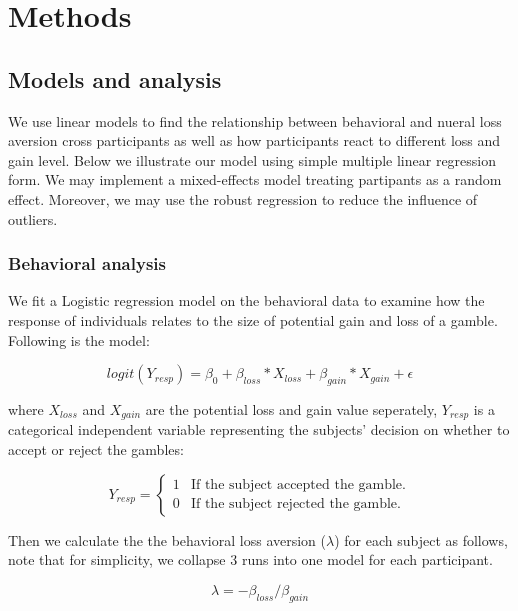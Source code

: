 \section{Methods}

\subsection{Models and analysis}

We use linear models to find the relationship between behavioral and nueral 
loss aversion cross participants as well as how participants react to different 
loss and gain level. Below we illustrate our model using simple multiple linear 
regression form. We may implement a mixed-effects model treating partipants as
a random effect. Moreover, we may use the robust regression to reduce the 
influence of outliers.

\subsubsection{Behavioral analysis}

We fit a Logistic regression model on the behavioral data to examine how the 
response of individuals relates to the size of potential gain and loss of a 
gamble. Following is the model:

\begin{equation}
logit(Y_{resp}) = \beta_0 + \beta_{loss} *X_{loss} + \beta_{gain} * X_{gain}  + 
\epsilon
\end{equation}

where $X_{loss}$ and $X_{gain}$ are the potential loss and gain value 
seperately, $Y_{resp}$ is a categorical independent variable representing 
the subjects' decision on whether to accept or reject the gambles:

\begin{displaymath}
Y_{resp} = \left \{ \begin{array}{ll}
1 & \textrm{If the subject accepted the gamble.} \\
0 & \textrm{If the subject rejected the gamble.}
\end{array} \right .
\end{displaymath}

Then we calculate the the behavioral loss aversion ($ \lambda $) for each 
subject as follows, note that for simplicity, we collapse 3 runs into one model
for each participant.

\begin{equation}
\lambda = -\beta_{loss} / \beta_{gain}
\end{equation}

